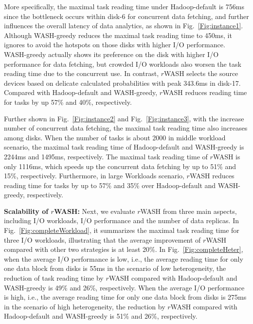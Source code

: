 \documentclass[conference]{IEEEtran}
\begin{document}
More specifically, the maximal task reading time under Hadoop-default is 756ms since the bottleneck occurs within disk-6 for concurrent data fetching, and further influences the overall latency of data analytics, as shown in Fig.~\ref{Fig:instance1}. Although WASH-greedy reduces the maximal task reading time to 450ms, it ignores to avoid the hotspots on those disks with higher I/O performance. WASH-greedy actually shows its preference on the disk with higher I/O performance for data fetching, but crowded I/O workloads also worsen the task reading time due to the concurrent use. In contrast, $r$WASH selects the source devices based on delicate calculated probabilities with peak 343.6ms in disk-17. 
Compared with Hadoop-default and WASH-greedy, $r$WASH reduces reading time for tasks by up 57\% and 40\%, respectively.   

Further shown in Fig.~\ref{Fig:instance2} and Fig.~\ref{Fig:instance3}, with the increase number of concurrent data fetching, the maximal task reading time also increases among disks. When the number of tasks is about 2000 in middle workload scenario, the maximal task reading time of 
Hadoop-default and WASH-greedy is 2244ms and 1495ms, respectively. The maximal task reading time of $r$WASH is only 1116ms, which speeds up the concurrent data fetching by up to 51\% and 15\%, respectively. 
Furthermore, in large Workloads scenario, $r$WASH reduces reading time for tasks by up to 57\% and 35\% over Hadoop-default and WASH-greedy, respectively. 


\textbf{Scalability of $r$WASH:} Next, we evaluate $r$WASH from three main aspects, including I/O workloads, I/O performance and the number of data replicas. In Fig.~\ref{Fig:completeWorkload}, it summarizes the maximal task reading time for three I/O workloads, illustrating that the average improvement of $r$WASH compared with other two strategies is at least 20\%. In Fig.~\ref{Fig:completeHeter}, when the average I/O performance is low, i.e., the average reading time for only one data block from disks is 55ms in the scenario of low heterogeneity, the reduction of task reading time by $r$WASH compared with Hadoop-default and WASH-greedy is 49\% and 26\%, respectively. When the average I/O performance is high, i.e., the average reading time for only one data block from disks is 275ms in the scenario of high heterogeneity, the reduction by $r$WASH compared with Hadoop-default and WASH-greedy is 51\% and 26\%, respectively.
\end{document}
